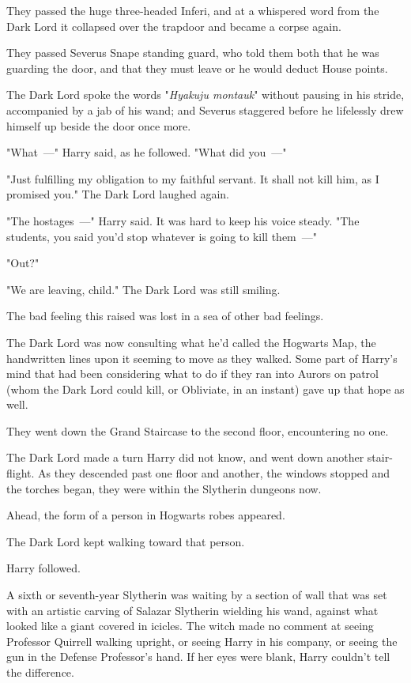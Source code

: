 They passed the huge three-headed Inferi, and at a whispered word from the Dark
Lord it collapsed over the trapdoor and became a corpse again.

They passed Severus Snape standing guard, who told them both that he was
guarding the door, and that they must leave or he would deduct House points.

The Dark Lord spoke the words "\emph{Hyakuju montauk}" without pausing in his
stride, accompanied by a jab of his wand; and Severus staggered before he
lifelessly drew himself up beside the door once more.

"What~---" Harry said, as he followed. "What did you~---"

"Just fulfilling my obligation to my faithful servant. It shall not kill him,
as I promised you." The Dark Lord laughed again.

"The hostages~---" Harry said. It was hard to keep his voice steady. "The
students, you said you'd stop whatever is going to kill them~---"


"Out?"

"We are leaving, child." The Dark Lord was still smiling.

The bad feeling this raised was lost in a sea of other bad feelings.

The Dark Lord was now consulting what he'd called the Hogwarts Map, the
handwritten lines upon it seeming to move as they walked. Some part of Harry's
mind that had been considering what to do if they ran into Aurors on patrol
(whom the Dark Lord could kill, or Obliviate, in an instant) gave up that hope
as well.

They went down the Grand Staircase to the second floor, encountering no one.

The Dark Lord made a turn Harry did not know, and went down another
stair-flight. As they descended past one floor and another, the windows stopped
and the torches began, they were within the Slytherin dungeons now.

Ahead, the form of a person in Hogwarts robes appeared.

The Dark Lord kept walking toward that person.

Harry followed.

A sixth or seventh-year Slytherin was waiting by a section of wall that was set
with an artistic carving of Salazar Slytherin wielding his wand, against what
looked like a giant covered in icicles. The witch made no comment at seeing
Professor Quirrell walking upright, or seeing Harry in his company, or seeing
the gun in the Defense Professor's hand. If her eyes were blank, Harry couldn't
tell the difference.

